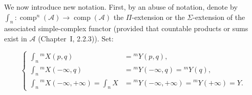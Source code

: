 We now introduce new notation. First, by an abuse of notation, denote by
$\int_n\colon\operatorname{comp}^n(\mathcal A)\longrightarrow
\operatorname{comp}(\mathcal A)$ the $\Pi$-extension or the
$\Sigma$-extension of the associated simple-complex functor (provided
that countable products or sums exist in $\mathcal A$
(Chapter~I, 2.2.3)). Set:

\begin{equation}
\left\{
\begin{aligned}
\int_n{}^{m}\!X(p,q)
  &={}^{m}\!Y(p,q),\\
\int_n{}^{m}\!X(-\infty,q)
  &={}^{m}\!Y(-\infty,q)={}^{m}\!Y(q),\\
\int_n{}^{m}\!X(-\infty,+\infty)=\int_n X
  &={}^{m}\!Y(-\infty,+\infty)={}^{m}\!Y(+\infty)=Y.
\end{aligned}
\right.
\tag{4.1.6.5}
\end{equation}
\endgroup
